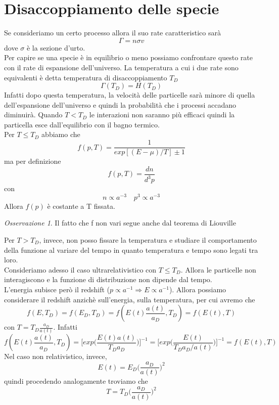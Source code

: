 \documentclass[10pt,a4paper]{article}
\theoremstyle{break}
\theoremstyle{remark}
\newtheorem{oss}{Osservazione}
\theoremstyle{definition}
\newcommand{\ra}{\Rightarrow}
\begin{document}
\section{Disaccoppiamento delle specie}
Se consideriamo un certo processo allora il suo rate caratteristico sarà
\[
\Gamma = n \sigma v
\]
dove $\sigma$ è la sezione d'urto.\\
Per capire se una specie è in equilibrio o meno possiamo confrontare questo rate con il rate di espansione dell'universo. La temperatura a cui i due rate sono equivalenti è detta temperatura di disaccoppiamento $T_D$
\[
\Gamma(T_D) = H(T_D)
\]
Infatti dopo questa temperatura, la velocità delle particelle sarà minore di quella dell'espansione dell'universo e quindi la probabilità che i processi accadano diminuirà. Quando $T < T_D$ le interazioni non saranno più efficaci quindi la particella esce dall'equilibrio con il bagno termico. \\
Per $T \le T_D$ abbiamo che
\[
f(p, T) = \frac{1}{exp[(E - \mu)/T] \pm 1}
\]
ma per definizione
\[
f(p, T) = \frac{dn}{d^3p}
\]
con 
\[
n \propto a^{-3} \quad p^3 \propto a^{-3}
\]
Allora $f(p)$ è costante a T fissata.
\begin{oss}
	Il fatto che f non vari segue anche dal teorema di Liouville
\end{oss}
Per $T > T_D$, invece, non posso fissare la temperatura e studiare il comportamento della funzione al variare del tempo in quanto temperatura e tempo sono legati tra loro.
\\
Consideriamo adesso il caso ultrarelativistico con $T \le T_D$. Allora le particelle non interagiscono e la funzione di distribuzione non dipende dal tempo.
\\
L'energia subisce però il redshift ($p \propto a^{-1} \ra E \propto a^{-1}$). Allora possiamo considerare il redshift anzichè sull'energia, sulla temperatura, per cui avremo che \[
f(E, T_D) = f(E_D, T_D) = f(E(t) \frac{a(t)}{a_D}, T_D) = f(E(t), T)
\]
con $T = T_D \frac{a_D}{a(t)}$. Infatti
\[
f(E(t) \frac{a(t)}{a_D}, T_D) = \bigg[exp\bigg(\frac{E(t) a(t)}{T_Da_D}\bigg)\bigg]^{-1} = \bigg[exp\bigg(\frac{E(t)}{T_Da_D / a(t)}\bigg)\bigg]^{-1} = f(E(t), T)
\]
Nel caso non relativistico, invece, 
\[
E(t) = E_D \bigg( \frac{a_D}{a(t)}\bigg)^2
\]
quindi procedendo analogamente troviamo che
\[
T = T_D \bigg( \frac{a_D}{a(t)}\bigg)^2
\]
\end{document}
